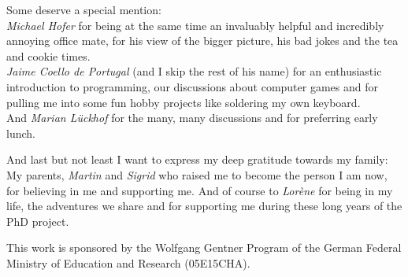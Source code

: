 \noindent Some deserve a special mention:\\
\emph{Michael Hofer} for being at the same time an invaluably helpful and incredibly annoying
office mate, for his view of the bigger picture, his bad jokes and the tea and cookie times.\\
\emph{Jaime Coello de Portugal} (and I skip the rest of his name) for an enthusiastic
introduction to programming,
our discussions about computer games
and for pulling me into some fun hobby projects like soldering my own keyboard.\\
And \emph{Marian Lückhof} for the many, many discussions and for preferring early lunch.

\noindent And last but not least I want to express my deep gratitude towards my family: My parents, \emph{Martin}
and \emph{Sigrid} who raised me to become the person I am now, for believing in me and supporting me.
And of course to \emph{Lorène} for being in my life, the adventures we share and for supporting me during these long years of the PhD project.

\vspace{2em}
\noindent This work is sponsored by the Wolfgang Gentner Program of the German Federal Ministry
of Education and Research (05E15CHA).